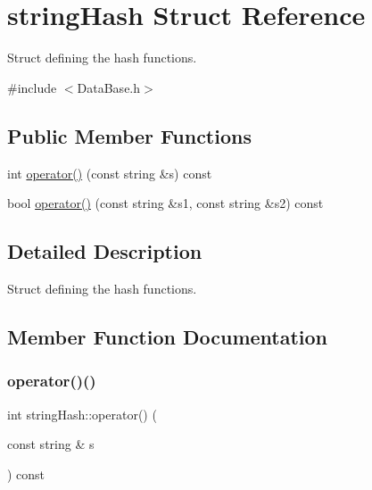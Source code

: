 \hypertarget{structstringHash}{}\section{string\+Hash Struct Reference}
\label{structstringHash}


Struct defining the hash functions.  




{\ttfamily \#include $<$Data\+Base.\+h$>$}

\subsection*{Public Member Functions}
\begin{DoxyCompactItemize}
\item 
int \hyperlink{structstringHash_ac4d7d160bcb2d79142c04bf5b0e867be}{operator()} (const string \&s) const
\item 
bool \hyperlink{structstringHash_af490d7bfd9ca18975134236254427481}{operator()} (const string \&s1, const string \&s2) const
\end{DoxyCompactItemize}


\subsection{Detailed Description}
Struct defining the hash functions. 

\subsection{Member Function Documentation}
\mbox{\label{structstringHash_ac4d7d160bcb2d79142c04bf5b0e867be}} 
\subsubsection{\texorpdfstring{operator()()}{operator()()}\hspace{0.1cm}{\footnotesize\ttfamily [1/2]}}
{\footnotesize\ttfamily int string\+Hash\+::operator() (\begin{DoxyParamCaption}\item[{const string \&}]{s }\end{DoxyParamCaption}) const\hspace{0.3cm}{\ttfamily [inline]}}

